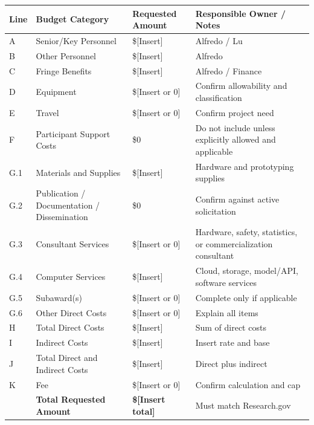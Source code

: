 \documentclass[11pt,letterpaper]{article}
\begin{document}
\begin{table}[htbp]
\centering
\renewcommand{\arraystretch}{1.25}
\begin{tabularx}{\textwidth}{
    p{}
    X
    p{}
    p{}
}
\toprule
\textbf{Line} &
\textbf{Budget Category} &
\textbf{Requested Amount} &
\textbf{Responsible Owner / Notes} \\
\midrule

A &
Senior/Key Personnel &
\$[Insert] &
Alfredo / Lu \\

B &
Other Personnel &
\$[Insert] &
Alfredo \\

C &
Fringe Benefits &
\$[Insert] &
Alfredo / Finance \\

D &
Equipment &
\$[Insert or 0] &
Confirm allowability and classification \\

E &
Travel &
\$[Insert or 0] &
Confirm project need \\

F &
Participant Support Costs &
\$0 &
Do not include unless explicitly allowed and applicable \\

G.1 &
Materials and Supplies &
\$[Insert] &
Hardware and prototyping supplies \\

G.2 &
Publication / Documentation / Dissemination &
\$0 &
Confirm against active solicitation \\

G.3 &
Consultant Services &
\$[Insert or 0] &
Hardware, safety, statistics, or commercialization consultant \\

G.4 &
Computer Services &
\$[Insert] &
Cloud, storage, model/API, software services \\

G.5 &
Subaward(s) &
\$[Insert or 0] &
Complete only if applicable \\

G.6 &
Other Direct Costs &
\$[Insert or 0] &
Explain all items \\

H &
Total Direct Costs &
\$[Insert] &
Sum of direct costs \\

I &
Indirect Costs &
\$[Insert] &
Insert rate and base \\

J &
Total Direct and Indirect Costs &
\$[Insert] &
Direct plus indirect \\

K &
Fee &
\$[Insert or 0] &
Confirm calculation and cap \\

\midrule
&
\textbf{Total Requested Amount} &
\textbf{\$[Insert total]} &
Must match Research.gov \\
\bottomrule
\end{tabularx}
\end{table}
\end{document}
